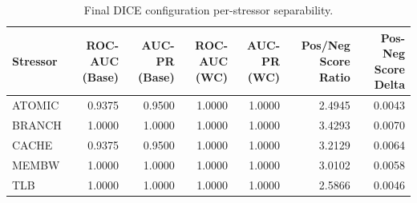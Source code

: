 \begin{table}[t]
\centering
\caption{Final DICE configuration per-stressor separability.}
\label{tab:dice_full_stressor}
\footnotesize
\begin{tabular}{lrrrrrr}
\toprule
Stressor & ROC-AUC (Base) & AUC-PR (Base) & ROC-AUC (WC) & AUC-PR (WC) & Pos/Neg Score Ratio & Pos-Neg Score Delta \\
\midrule
ATOMIC & 0.9375 & 0.9500 & 1.0000 & 1.0000 & 2.4945 & 0.0043 \\
BRANCH & 1.0000 & 1.0000 & 1.0000 & 1.0000 & 3.4293 & 0.0070 \\
CACHE & 0.9375 & 0.9500 & 1.0000 & 1.0000 & 3.2129 & 0.0064 \\
MEMBW & 1.0000 & 1.0000 & 1.0000 & 1.0000 & 3.0102 & 0.0058 \\
TLB & 1.0000 & 1.0000 & 1.0000 & 1.0000 & 2.5866 & 0.0046 \\
\bottomrule
\end{tabular}

\end{table}
